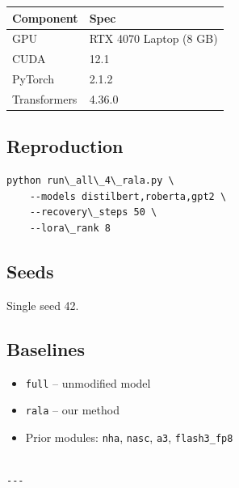\begin{table}[H]
\centering
\small
\begin{tabular}{ll}
\toprule
\textbf{Component} & \textbf{Spec} \\
\midrule
GPU & RTX 4070 Laptop (8 GB) \\
CUDA & 12.1 \\
PyTorch & 2.1.2 \\
Transformers & 4.36.0 \\
\bottomrule
\end{tabular}
\end{table}

\subsection{Reproduction}

\begin{lstlisting}
python run\_all\_4\_rala.py \
    --models distilbert,roberta,gpt2 \
    --recovery\_steps 50 \
    --lora\_rank 8
\end{lstlisting}

\subsection{Seeds}

Single seed 42.

\subsection{Baselines}

\begin{itemize}
\item \texttt{full} -- unmodified model
\item \texttt{rala} -- our method
\item Prior modules: \texttt{nha}, \texttt{nasc}, \texttt{a3}, \texttt{flash3\_fp8}
\end{itemize}
\begin{lstlisting}

---
\end{lstlisting}